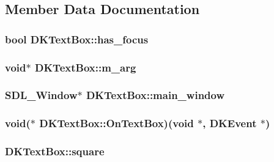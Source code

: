 \subsection{Member Data Documentation}
\hypertarget{class_d_k_text_box_a1467643098fa300baaa13301a6953b8d}{
\subsubsection[{has\-\_\-focus}]{\setlength{\rightskip}{0pt plus 5cm}bool D\-K\-Text\-Box\-::has\-\_\-focus}}\label{class_d_k_text_box_a1467643098fa300baaa13301a6953b8d}
\hypertarget{class_d_k_text_box_a4f4e04f99ac6df8a6fc2be8356a59f8e}{
\subsubsection[{m\-\_\-arg}]{\setlength{\rightskip}{0pt plus 5cm}void$\ast$ D\-K\-Text\-Box\-::m\-\_\-arg}}\label{class_d_k_text_box_a4f4e04f99ac6df8a6fc2be8356a59f8e}
\hypertarget{class_d_k_text_box_af43c9aea5cc21a67db7bc30ce99709a6}{
\subsubsection[{main\-\_\-window}]{\setlength{\rightskip}{0pt plus 5cm}S\-D\-L\-\_\-\-Window$\ast$ D\-K\-Text\-Box\-::main\-\_\-window}}\label{class_d_k_text_box_af43c9aea5cc21a67db7bc30ce99709a6}
\hypertarget{class_d_k_text_box_a0f7e87f3231708211fc61dbf12cb611c}{
\subsubsection[{On\-Text\-Box}]{\setlength{\rightskip}{0pt plus 5cm}void($\ast$ D\-K\-Text\-Box\-::\-On\-Text\-Box)(void $\ast$, {\bf D\-K\-Event} $\ast$)}}\label{class_d_k_text_box_a0f7e87f3231708211fc61dbf12cb611c}
\hypertarget{class_d_k_text_box_a6cd6bf1c857b5557a473dae753d3daee}{
\subsubsection[{square}]{ D\-K\-Text\-Box\-::square}}\label{class_d_k_text_box_a6cd6bf1c857b5557a473dae753d3daee}
